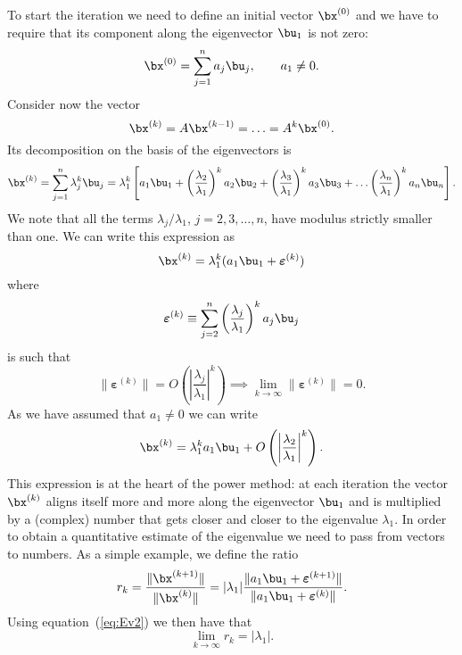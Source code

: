 To start the iteration we need to define an initial vector $\bx^{(0)}$
and we have to require that its component along the eigenvector
$\bu_1$ is not zero:
%
\begin{equation*}
 \bx^{(0)} = \sum_{j=1}^n a_j \bu_j , \qquad a_1 \neq 0 .
\end{equation*}
%
Consider now the vector
%
\begin{equation*}
 \bx^{(k)} = A \bx^{(k-1)} = \ldots = A^k \bx^{(0)}.
\end{equation*}
%
Its decomposition on the basis of the eigenvectors is
%
\begin{equation*}
 \bx^{(k)} = \sum_{j=1}^n \lambda_j^k \bu_j =
             \lambda_1^k \left [ a_1 \bu_1 +
             \left ( \frac{\lambda_2}{\lambda_1} \right )^k a_2 \bu_2 +
             \left ( \frac{\lambda_3}{\lambda_1} \right )^k a_3 \bu_3 +
             \ldots
             \left ( \frac{\lambda_n}{\lambda_1} \right )^k a_n \bu_n
              \right ] .
\end{equation*}
%
We note that all the terms $\lambda_j/\lambda_1$, $j=2,3,\ldots,n$,
have modulus strictly smaller than one.  We can write this expression
as
%
\begin{equation}
  \bx^{(k)} = \lambda_1^k ( a_1 \bu_1 + \boldsymbol{\varepsilon}^{(k)} )
  \label{eq:Ev3}
\end{equation}
%
where
%
\begin{equation}
  \boldsymbol{\varepsilon}^{(k)} \equiv  \sum_{j=2}^n
  \left ( \frac{\lambda_j}{\lambda_1} \right )^k a_j \bu_j
  \label{eq:Ev5}
\end{equation}
%
is such that
%
\begin{equation}
  \| \boldsymbol{\varepsilon}^{(k)} \| =
  O \left ( \left | \frac{\lambda_j}{\lambda_1} \right |^k \right )
  \implies
  \lim_{k \to \infty} \| \boldsymbol{\varepsilon}^{(k)} \| = 0.
  \label{eq:Ev2}
\end{equation}
%
As we have assumed that $a_1 \neq 0$ we can write
%
\begin{equation}
  \bx^{(k)} = \lambda_1^k a_1 \bu_1 +
  O \left ( \left | \frac{\lambda_2}{\lambda_1} \right |^k \right ) .
  \label{eq:Ev6}
\end{equation}
%
This expression is at the heart of the power method: at each iteration
the vector $\bx^{(k)}$ aligns itself more and more along the
eigenvector $\bu_1$ and is multiplied by a (complex) number that gets
closer and closer to the eigenvalue $\lambda_1$.  In order to obtain a
quantitative estimate of the eigenvalue we need to pass from vectors
to numbers. As a simple example, we define the ratio
%
\begin{equation*}
 r_k = \frac{\| \bx^{(k+1)} \|}{\| \bx^{(k)} \|} = | \lambda_1 |
        \frac{\| a_1 \bu_1 + \boldsymbol{\varepsilon}^{(k+1)} \|}
             {\| a_1 \bu_1 + \boldsymbol{\varepsilon}^{(k)} \|} .
\end{equation*}
%
Using equation~(\ref{eq:Ev2}) we then have that
%
\begin{equation*}
 \lim_{k \to \infty} r_k = | \lambda_1 | .
\end{equation*}

